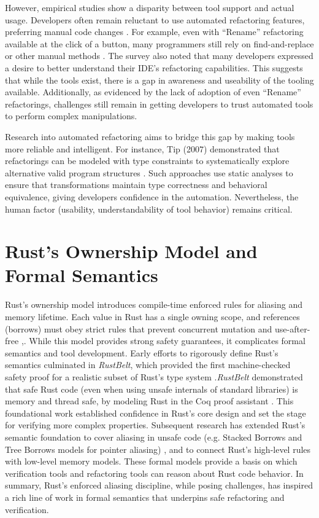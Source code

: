 However, empirical studies show a disparity between tool support and actual
usage. Developers often remain reluctant to use automated refactoring features,
preferring manual code changes
\cite{OneThousandOneStories-SoftwareRefactoring}. For example, even with
“Rename” refactoring available at the click of a button, many programmers still
rely on find-and-replace or other manual methods
\cite{OneThousandOneStories-SoftwareRefactoring}. The survey also noted that
many developers expressed a desire to better understand their IDE's refactoring
capabilities. This suggests that while the tools exist, there is a gap in
awareness and useability of the tooling available. Additionally, as evidenced by
the lack of adoption of even ``Rename'' refactorings,  challenges still remain
in getting developers to trust automated tools to perform complex manipulations.

Research into automated refactoring aims to bridge this gap by making tools more
reliable and intelligent. For instance, Tip (2007) demonstrated that
refactorings can be modeled with type constraints to systematically explore
alternative valid program structures \cite{RefactoringUsingTypeConstraints}.
Such approaches use static analyses to ensure that transformations maintain type
correctness and behavioral equivalence, giving developers confidence in the
automation. Nevertheless, the human factor (usability, understandability of tool
behavior) remains critical.
\section{Rust's Ownership Model and Formal Semantics}
\label{sec:rust_owndership_model_formal_semantics}

Rust's ownership model introduces compile-time enforced rules for aliasing and
memory lifetime. Each value in Rust has a single owning scope, and references
(borrows) must obey strict rules that prevent concurrent mutation and
use-after-free \cite{automated_refactoring_of_rust_programs},\cite{the_rust_language}.
While this model provides strong safety guarantees, it complicates formal
semantics and tool development. Early efforts to rigorously define Rust's
semantics culminated in \textit{RustBelt}, which provided the first machine-checked
safety proof for a realistic subset of Rust's type system
\cite{RustBelt}.\textit{RustBelt} demonstrated that safe Rust code (even when
using unsafe internals of standard libraries) is memory and thread safe, by
modeling Rust in the Coq proof assistant \cite{RustBelt}. This foundational work
established confidence in Rust's core design and set the stage for verifying
more complex properties. Subsequent research has extended Rust's semantic
foundation to cover aliasing in unsafe code (e.g. Stacked Borrows and Tree
Borrows models for pointer aliasing) \cite{AENEAS_PART_2}, and to connect Rust's
high-level rules with low-level memory models. These formal models provide a
basis on which verification tools and refactoring tools can reason about Rust
code behavior. In summary, Rust's enforced aliasing discipline, while posing
challenges, has inspired a rich line of work in formal semantics that underpins
safe refactoring and verification.

